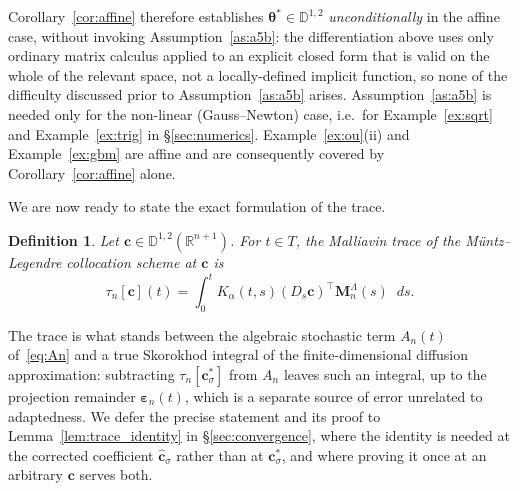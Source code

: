 \documentclass[11pt, a4paper]{article}
\theoremstyle{theoremstyle}
\theoremstyle{definitionstyle}
\newtheorem{definition}[theorem]{Definition}
\newcommand{\dd}{\mathop{}\!d}
\begin{document}
Corollary~\ref{cor:affine} therefore establishes $\boldsymbol\theta^*\in\mathbb D^{1,2}$ \emph{unconditionally} in the affine case, without invoking Assumption~\ref{as:a5b}: the differentiation above uses only ordinary matrix calculus applied to an explicit closed form that is valid on the whole of the relevant space, not a locally-defined implicit function, so none of the difficulty discussed prior to Assumption~\ref{as:a5b} arises. Assumption~\ref{as:a5b} is needed only for the non-linear (Gauss--Newton) case, i.e.\ for Example~\ref{ex:sqrt} and Example~\ref{ex:trig} in \S\ref{sec:numerics}. Example~\ref{ex:ou}(ii) and Example~\ref{ex:gbm} are affine and are consequently covered by Corollary~\ref{cor:affine} alone.

We are now ready to state the exact formulation of the trace.

\begin{definition}\label{def:trace}
    Let $\mathbf c\in\mathbb D^{1,2}(\mathbb R^{n+1})$. For $t\in T$, the \emph{Malliavin trace} of the M\"untz--Legendre collocation scheme at $\mathbf c$ is
    \begin{equation}\label{eq:trace}
        \tau_n[\mathbf c](t) = \int_0^tK_\alpha(t,s)(D_s\mathbf c)^\top\mathbf M_n^\Lambda(s)\dd{s}.
    \end{equation}
\end{definition}

The trace is what stands between the algebraic stochastic term $A_n(t)$ of~\eqref{eq:An} and a true Skorokhod integral of the finite-dimensional diffusion approximation: subtracting $\tau_n[\mathbf c_\sigma^*]$ from $A_n$ leaves such an integral, up to the projection remainder $\boldsymbol\varepsilon_n(t)$, which is a separate source of error unrelated to adaptedness. We defer the precise statement and its proof to Lemma~\ref{lem:trace_identity} in \S\ref{sec:convergence}, where the identity is needed at the corrected coefficient $\hat{\mathbf c}_\sigma$ rather than at $\mathbf c_\sigma^*$, and where proving it once at an arbitrary $\mathbf c$ serves both.
\end{document}
